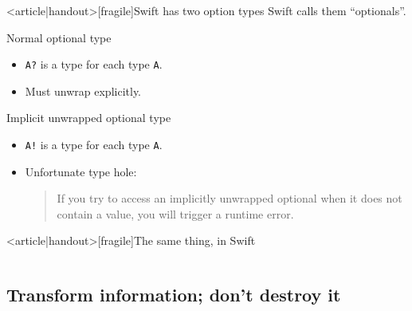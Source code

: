 \begin{frame}<article|handout>[fragile]{Swift has two option types}
  Swift calls them ``optionals''.

  \begin{block}{Normal optional type}
    \begin{itemize}
    \item \texttt{A?} is a type for each type \texttt{A}.
    \item Must unwrap explicitly.
    \end{itemize}
  \end{block}

  \begin{block}{Implicit unwrapped optional type}
    \begin{itemize}
    \item \texttt{A!} is a type for each type \texttt{A}.
    \item Unfortunate type hole:
      \begin{quote}
        If you try to access an implicitly unwrapped optional when it
        does not contain a value, you will trigger a runtime error.
      \end{quote}
    \end{itemize}
  \end{block}
\end{frame}

\begin{frame}<article|handout>[fragile]{The same thing, in Swift}
  \inputminted{swift}{FizzBuzz8.swift}
\end{frame}

\subsection{Transform information; don't destroy it}

